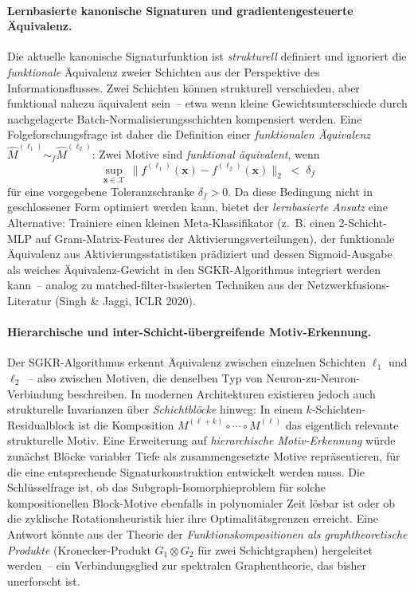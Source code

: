 \documentclass[12pt, a4paper, openany]{report}
\newcommand{\calX}{\mathcal{X}}
\begin{document}
\paragraph{Lernbasierte kanonische Signaturen und gradientengesteuerte Äquivalenz.}
Die aktuelle kanonische Signaturfunktion ist \emph{strukturell} definiert
und ignoriert die \emph{funktionale} Äquivalenz zweier Schichten aus der
Perspektive des Informationsflusses.  Zwei Schichten können strukturell
verschieden, aber funktional nahezu äquivalent sein~-- etwa wenn kleine
Gewichtsunterschiede durch nachgelagerte Batch-Normalisierungsschichten
kompensiert werden.  Eine Folgeforschungsfrage ist daher die Definition
einer \emph{funktionalen Äquivalenz}
$\hat{M}^{(\ell_1)} \sim_f \hat{M}^{(\ell_2)}$: Zwei Motive sind
\emph{funktional äquivalent}, wenn
\[
  \sup_{\bm{x} \in \calX}\,
  \bigl\| f^{(\ell_1)}(\bm{x}) - f^{(\ell_2)}(\bm{x}) \bigr\|_2
  \;<\; \delta_f
\]
für eine vorgegebene Toleranzschranke $\delta_f > 0$.  Da diese Bedingung
nicht in geschlossener Form optimiert werden kann, bietet der
\emph{lernbasierte Ansatz} eine Alternative: Trainiere einen kleinen
Meta-Klassifikator (z.~B. einen 2-Schicht-MLP auf Gram-Matrix-Features der
Aktivierungsverteilungen), der funktionale Äquivalenz aus Aktivierungsstatistiken
prädiziert und dessen Sigmoid-Ausgabe als weiches Äquivalenz-Gewicht in
den SGKR-Algorithmus integriert werden kann~-- analog zu
matched-filter-basierten Techniken aus der Netzwerkfusions-Literatur
(Singh \& Jaggi, ICLR 2020).

\paragraph{Hierarchische und inter-Schicht-übergreifende Motiv-Erkennung.}
Der SGKR-Algorithmus erkennt Äquivalenz zwischen einzelnen Schichten $\ell_1$
und $\ell_2$~-- also zwischen Motiven, die denselben Typ von
Neuron-zu-Neuron-Verbindung beschreiben.  In modernen Architekturen existieren
jedoch auch strukturelle Invarianzen über \emph{Schichtblöcke} hinweg: In
einem $k$-Schichten-Residualblock ist die Komposition
$M^{(\ell+k)} \circ \cdots \circ M^{(\ell)}$ das eigentlich relevante
strukturelle Motiv.  Eine Erweiterung auf \emph{hierarchische Motiv-Erkennung}
würde zunächst Blöcke variabler Tiefe als zusammengesetzte Motive
repräsentieren, für die eine entsprechende Signaturkonstruktion entwickelt
werden muss.  Die Schlüsselfrage ist, ob das Subgraph-Isomorphieproblem für
solche kompositionellen Block-Motive ebenfalls in polynomialer Zeit lösbar
ist oder ob die zyklische Rotationsheuristik hier ihre Optimalitätsgrenzen
erreicht.  Eine Antwort könnte aus der Theorie der \emph{Funktionskompositionen
als graphtheoretische Produkte} (Kronecker-Produkt $G_1 \otimes G_2$ für
zwei Schichtgraphen) hergeleitet werden~-- ein Verbindungsglied zur
spektralen Graphentheorie, das bisher unerforscht ist.
\end{document}
